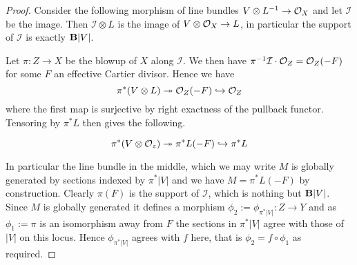 \begin{proof}
	
	Consider the following morphism of line bundles
	$V \otimes L^{-1} \to \ox$
	and let $\mathcal{I}$ be the image. Then $\mathcal{I} \otimes L$ is the image of $V \otimes \ox \to L$, in particular the support of $\mathcal{I}$ is exactly $\BB|V|$.
	
	Let $\pi:Z \to X$ be the blowup of $X$ along $\mathcal{I}$. We then have $\pi^{-1}\mathcal{I}\cdot \ox[Z]=\ox[Z](-F)$ for some $F$ an effective Cartier divisor. Hence we have
	\[\pi^{*}(V\otimes L) \twoheadrightarrow \ox[Z](-F) \hookrightarrow \ox[Z] \]
	where the first map is surjective by right exactness of the pullback functor. Tensoring by $\pi^{*}L$ then gives the following.
	
	\[\pi^{*}(V\otimes \ox[z]) \twoheadrightarrow \pi^{*}L(-F) \hookrightarrow \pi^{*}L \]
	
	In particular the line bundle in the middle, which we may write $M$ is globally generated by sections indexed by $\pi^{*}|V|$ and we have $M=\pi^{*}L(-F)$ by construction. Clearly $\pi(F)$ is the support of $\mathcal{I}$, which is nothing but $\BB|V|$. Since $M$ is globally generated it defines a morphism $\phi_{2}:=\phi_{\pi^{*}|V|}:Z \to Y$ and as $\phi_{1}:=\pi$ is an isomorphism away from $F$ the sections in $\pi^{*}|V|$ agree with those of $|V|$ on this locus. Hence $\phi_{\pi^{*}|V|}$ agrees with $f$ here, that is $\phi_{2}=f\circ \phi_{1}$ as required. 
\end{proof}

%	
%	
%
%	
%	
%	
%	
%	

